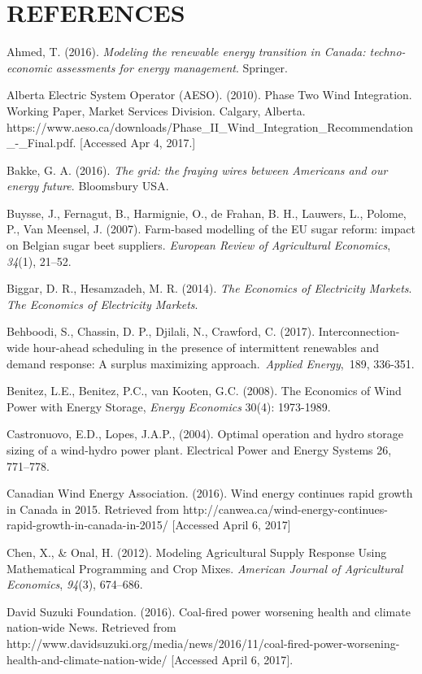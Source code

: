 \section{REFERENCES }\label{references}

Ahmed, T. (2016). \emph{Modeling the renewable energy transition in
Canada: techno-economic assessments for energy management}. Springer.

Alberta Electric System Operator (AESO). (2010). Phase Two Wind
Integration. Working Paper, Market Services Division. Calgary, Alberta.
https://www.aeso.ca/downloads/Phase\_II\_Wind\_Integration\_Recommendation\_-\_Final.pdf.
{[}Accessed Apr 4, 2017.{]}

Bakke, G. A. (2016). \emph{The grid: the fraying wires between Americans
and our energy future}. Bloomsbury USA.

Buysse, J., Fernagut, B., Harmignie, O., de Frahan, B. H., Lauwers, L.,
Polome, P., Van Meensel, J. (2007). Farm-based modelling of the EU sugar
reform: impact on Belgian sugar beet suppliers. \emph{European Review of
Agricultural Economics}, \emph{34}(1), 21--52.

Biggar, D. R., Hesamzadeh, M. R. (2014). \emph{The Economics of
Electricity Markets}. \emph{The Economics of Electricity Markets}.

Behboodi, S., Chassin, D. P., Djilali, N., Crawford, C. (2017).
Interconnection-wide hour-ahead scheduling in the presence of
intermittent renewables and demand response: A surplus maximizing
approach.~\emph{Applied Energy},~189, 336-351.

Benitez, L.E., Benitez, P.C., van Kooten, G.C. (2008). The Economics of
Wind Power with Energy Storage, \emph{Energy Economics} 30(4):
1973-1989.

Castronuovo, E.D., Lopes, J.A.P., (2004). Optimal operation and hydro
storage sizing of a wind-hydro power plant. Electrical Power and Energy
Systems 26, 771--778.

Canadian Wind Energy Association. (2016). Wind energy continues rapid
growth in Canada in 2015. Retrieved from
http://canwea.ca/wind-energy-continues-rapid-growth-in-canada-in-2015/
{[}Accessed April 6, 2017{]}

Chen, X., \& Onal, H. (2012). Modeling Agricultural Supply Response
Using Mathematical Programming and Crop Mixes. \emph{American Journal of
Agricultural Economics}, \emph{94}(3), 674--686.

David Suzuki Foundation. (2016). Coal-fired power worsening health and
climate nation-wide \textbar{} News. Retrieved from
http://www.davidsuzuki.org/media/news/2016/11/coal-fired-power-worsening-health-and-climate-nation-wide/
{[}Accessed April 6, 2017{]}.

